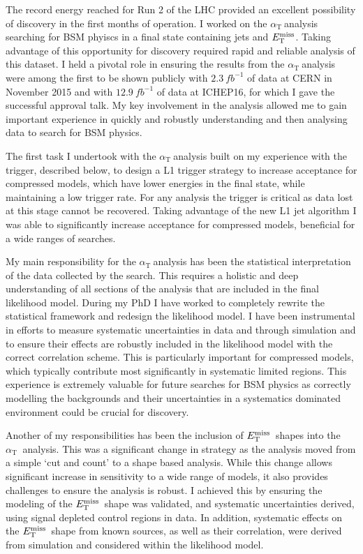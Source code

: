 \documentclass[11pt]{article}
\theoremstyle{plain} \numberwithin{equation}{section}
\theoremstyle{definition}
\DeclareRobustCommand{\alphat}{$\alpha_{\text{T}}~$}
\DeclareRobustCommand{\met}{$\mbox{$E_\text{T}^{\rm miss}$}\xspace$}
\newcounter{list}
\begin{document}
The record energy reached for Run 2 of the LHC provided an excellent possibility of discovery
in the first months of operation. I worked on the \alphat analysis searching
for BSM phyiscs in a final state containing jets and \met. 
Taking advantage of this opportunity for discovery required rapid and reliable analysis of this dataset. 
I held a pivotal role in ensuring the results from the \alphat analysis were among the 
first to be shown publicly with $2.3~{fb}^{-1}$ of data at CERN in November 2015
and with $12.9~{fb}^{-1}$ of data at ICHEP16, for which I gave the successful
approval talk. My key involvement in the analysis allowed me to gain important experience 
in quickly and robustly understanding and then analysing data to search for BSM physics. 

The first task I undertook with the \alphat analysis built on my experience with the 
trigger, described below, to design a L1 trigger strategy to increase acceptance for compressed models,
which have lower energies in the final state, while maintaining a low trigger rate. 
For any analysis the trigger is critical as data lost at this stage cannot be recovered. 
Taking advantage of the new L1 jet algorithm I was able to significantly increase 
acceptance for compressed models, beneficial for a wide ranges of searches.

My main responsibility for the \alphat analysis has been the statistical interpretation
of the data collected by the search. This requires a holistic and deep understanding
of all sections of the analysis that are included in the final likelihood model. During my
PhD I have worked to completely rewrite the statistical framework and redesign the likelihood model. 
I have been instrumental in efforts to measure systematic uncertainties in data and through simulation and to
ensure their effects are robustly included in the likelihood 
model with the correct correlation scheme. This is particularly important for compressed models, which typically
contribute most significantly in systematic limited regions. This experience is extremely valuable 
for future searches for BSM physics as correctly modelling the backgrounds and their uncertainties in a systematics 
dominated environment could be crucial for discovery.

Another of my responsibilities has been the inclusion of \met~shapes into the \alphat
analysis. This was a significant change in strategy as the analysis moved from a simple `cut and
count' to a shape based analysis. While this change allows significant increase in sensitivity to a wide 
range of models, it also provides challenges to ensure the analysis is robust. I achieved this
by ensuring the modeling of the \met~shape was validated, and systematic uncertainties derived, 
using signal depleted control regions in data. In addition, systematic effects on the \met~shape from known sources,
as well as their correlation, were derived from simulation and considered within the likelihood model.
\end{document}
